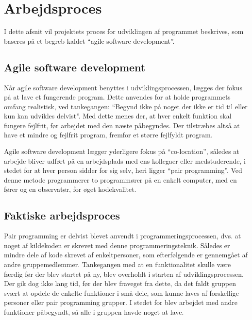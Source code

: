\chapter{Arbejdsproces}\label{chap:arbejdsproces}

I dette afsnit vil projektets proces for udviklingen af programmet beskrives, som baseres på et begreb kaldet ``agile software development''.

\section{Agile software development}\label{sec:agile-software-development}
Når agile software development benyttes i udviklingsprocessen, lægges der fokus på at lave et fungerende program.
Dette anvendes for at holde programmets omfang realistisk, ved tankegangen:
``Begynd ikke på noget der ikke er tid til eller kun kan udvikles delvist''.
Med dette menes der, at hver enkelt funktion skal fungere fejlfrit, før arbejdet med den næste påbegyndes. 
Der tilstræbes altså at have et mindre og fejlfrit program, fremfor et større fejlfyldt program.

Agile software development lægger yderligere fokus på ``co-location'', således at arbejde bliver udført på en arbejdsplads med ens kollegaer eller medstuderende, i stedet for at hver person sidder for sig selv, heri ligger ``pair programming''. 
Ved denne metode programmerer to programmører på en enkelt computer, med en fører og en observatør, for øget kodekvalitet.\citep{agile_software}

\section{Faktiske arbejdsproces}\label{sec:faktiske-arbejdsproces}
Pair programming er delvist blevet anvendt i programmeringsprocessen, dvs. at noget af kildekoden er skrevet med denne programmeringsteknik.
Således er mindre dele af kode skrevet af enkeltpersoner, som efterfølgende er gennemgået af andre gruppemedlemmer.
Tankegangen med at en funktionalitet skulle være færdig før der blev startet på ny, blev overholdt i starten af udviklingsprocessen.
Der gik dog ikke lang tid, før der blev fraveget fra dette, da det faldt gruppen svært at opdele de enkelte funktioner i små dele, som kunne laves af forskellige personer eller pair programming grupper.
I stedet for blev arbejdet med andre funktioner påbegyndt, så alle i gruppen havde noget at lave.  

